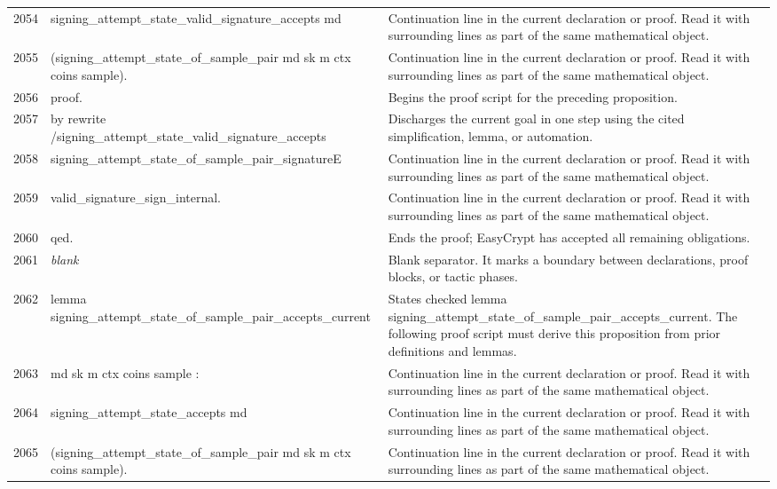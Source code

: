 \documentclass[10pt]{article}
\begin{document}
\begin{longtable}{r L{0.53\textwidth} L{0.37\textwidth}}
2054 & {\ttfamily\scriptsize   signing\_attempt\_state\_valid\_signature\_accepts md} & Continuation line in the current declaration or proof.  Read it with surrounding lines as part of the same mathematical object. \\
2055 & {\ttfamily\scriptsize     (signing\_attempt\_state\_of\_sample\_pair md sk m ctx coins sample).} & Continuation line in the current declaration or proof.  Read it with surrounding lines as part of the same mathematical object. \\
2056 & {\ttfamily\scriptsize proof.} & Begins the proof script for the preceding proposition. \\
2057 & {\ttfamily\scriptsize by rewrite /signing\_attempt\_state\_valid\_signature\_accepts} & Discharges the current goal in one step using the cited simplification, lemma, or automation. \\
2058 & {\ttfamily\scriptsize            signing\_attempt\_state\_of\_sample\_pair\_signatureE} & Continuation line in the current declaration or proof.  Read it with surrounding lines as part of the same mathematical object. \\
2059 & {\ttfamily\scriptsize            valid\_signature\_sign\_internal.} & Continuation line in the current declaration or proof.  Read it with surrounding lines as part of the same mathematical object. \\
2060 & {\ttfamily\scriptsize qed.} & Ends the proof; EasyCrypt has accepted all remaining obligations. \\
2061 & {\ttfamily\scriptsize \emph{blank}} & Blank separator.  It marks a boundary between declarations, proof blocks, or tactic phases. \\
2062 & {\ttfamily\scriptsize lemma signing\_attempt\_state\_of\_sample\_pair\_accepts\_current} & States checked lemma signing\_attempt\_state\_of\_sample\_pair\_accepts\_current.  The following proof script must derive this proposition from prior definitions and lemmas. \\
2063 & {\ttfamily\scriptsize    md sk m ctx coins sample :} & Continuation line in the current declaration or proof.  Read it with surrounding lines as part of the same mathematical object. \\
2064 & {\ttfamily\scriptsize   signing\_attempt\_state\_accepts md} & Continuation line in the current declaration or proof.  Read it with surrounding lines as part of the same mathematical object. \\
2065 & {\ttfamily\scriptsize     (signing\_attempt\_state\_of\_sample\_pair md sk m ctx coins sample).} & Continuation line in the current declaration or proof.  Read it with surrounding lines as part of the same mathematical object. \\

\end{longtable}
\end{document}
